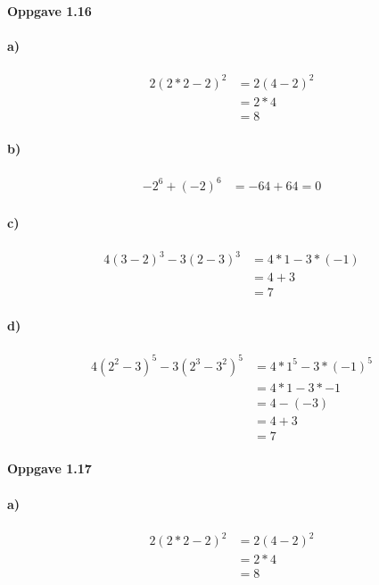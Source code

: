 \documentclass{article}
\begin{document}
\paragraph{Oppgave 1.16}
\paragraph{a)}
\begin{align*}
  2(2 * 2 - 2)^2 &= 2(4 -2)^2\\
&= 2 * 4\\
&= 8
\end{align*}

\paragraph{b)}
\begin{align*}
  -2^6 + (-2)^6 &= -64 + 64 = 0
\end{align*}
\paragraph{c)}
\begin{align*}
  4(3 - 2)^3 - 3(2 - 3)^3 &= 4 * 1 - 3 * (-1)\\
  &= 4 + 3\\
  &= 7
\end{align*}
\paragraph{d)}
\begin{align*}
  4(2^2 - 3)^5 - 3(2^3 - 3^2)^5 &= 4 * 1^5 - 3 * (-1)^5 \\
  &= 4 * 1 - 3 * -1 \\
  &= 4 - (-3) \\
  &= 4 + 3 \\
  &= 7
\end{align*}

\paragraph{Oppgave 1.17}
\paragraph{a)}
\begin{align*}
  2(2 * 2 - 2)^2 &= 2(4 -2)^2\\
&= 2 * 4\\
&= 8
\end{align*}
\end{document}

